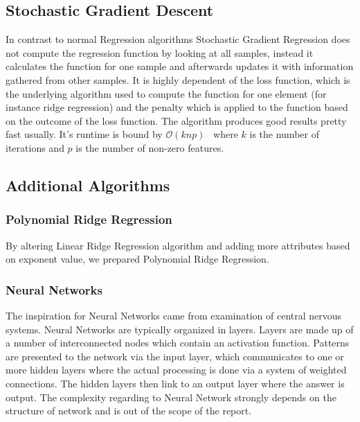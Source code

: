 \subsection{Stochastic Gradient Descent}
In contrast to normal Regression algorithms Stochastic Gradient Regression does not compute the regression function by looking at all samples, instead it calculates the function for one sample and afterwards updates it with information gathered from other samples. It is highly dependent of the loss function, which is the underlying algorithm used to compute the function for one element (for instance ridge regression) and the penalty which is applied to the function based on the outcome of the loss function. The algorithm produces good results pretty fast usually. It's runtime is bound by $\mathcal{O}(knp)$~\cite{alg:sgd} where $k$ is the number of iterations and $p$ is the number of non-zero features. 
\subsection{Additional Algorithms}
\subsubsection{Polynomial Ridge Regression}
By altering Linear Ridge Regression algorithm and adding more attributes based on exponent value, we prepared Polynomial Ridge Regression.
\subsubsection{Neural Networks}
The inspiration for Neural Networks came from examination of central nervous systems. Neural Networks are typically organized in layers. Layers are made up of a number of interconnected nodes which contain an activation function. Patterns are presented to the network via the input layer, which communicates to one or more hidden layers where the actual processing is done via a system of weighted connections. The hidden layers then link to an output layer where the answer is output. The complexity regarding to Neural Network strongly depends on the structure of network and is out of the scope of the report.~\cite{alg:nn}